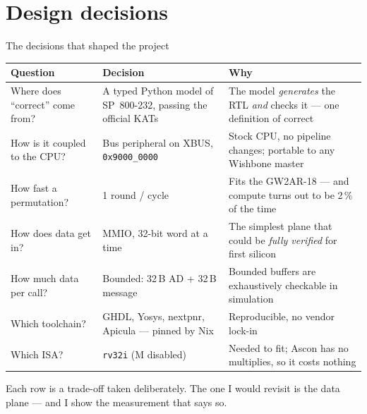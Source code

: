\documentclass[aspectratio=169,11pt]{beamer}
\newcommand{\code}[1]{\texttt{\small #1}}
\begin{document}
\section{Design decisions}

\begin{frame}{The decisions that shaped the project}
\vspace{-1mm}
{\footnotesize\setlength{\tabcolsep}{4pt}\renewcommand{\arraystretch}{1.02}
\begin{tabular}{p{2.9cm} p{3.7cm} p{6.2cm}}
\toprule
\textbf{Question} & \textbf{Decision} & \textbf{Why}\\
\midrule
Where does ``correct'' come from? & A typed Python model of SP~800-232, passing the official KATs
  & The model \emph{generates} the RTL \emph{and} checks it --- one definition of correct\\
How is it coupled to the CPU? & Bus peripheral on XBUS, \code{0x9000\_0000}
  & Stock CPU, no pipeline changes; portable to any Wishbone master\\
How fast a permutation? & 1 round / cycle
  & Fits the GW2AR-18 --- and compute turns out to be 2\,\% of the time\\
How does data get in? & MMIO, 32-bit word at a time
  & The simplest plane that could be \emph{fully verified} for first silicon\\[-0.4mm]
How much data per call? & Bounded: 32\,B AD + 32\,B message
  & Bounded buffers are exhaustively checkable in simulation\\
Which toolchain? & GHDL, Yosys, nextpnr, Apicula --- pinned by Nix
  & Reproducible, no vendor lock-in\\
Which ISA? & \code{rv32i} (M disabled)
  & Needed to fit; Ascon has no multiplies, so it costs nothing\\
\bottomrule
\end{tabular}}
\vspace{1.5mm}
{\footnotesize Each row is a trade-off taken deliberately. The one I would revisit
is the \alert{data plane} --- and I show the measurement that says so.}
\end{frame}
\end{document}

